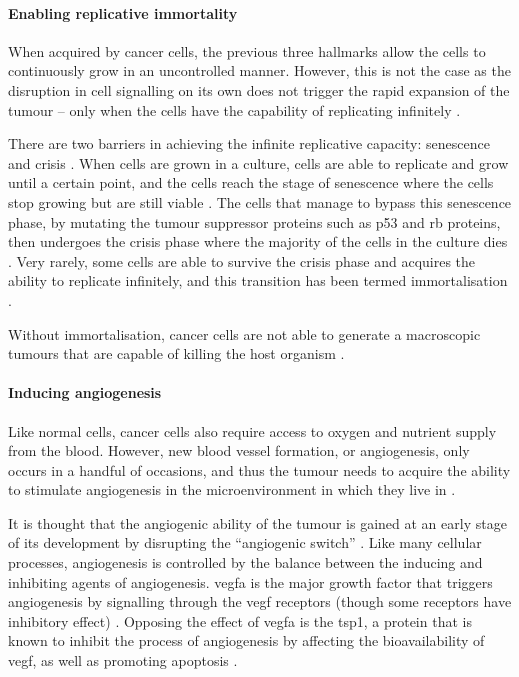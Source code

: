 \paragraph{Enabling replicative immortality}

\noindent
When acquired by cancer cells, the previous three hallmarks allow the cells to continuously grow in an uncontrolled manner.
However, this is not the case as the disruption in cell signalling on its own does not trigger the rapid expansion of the tumour -- only when the cells have the capability of replicating infinitely \citep{Hanahan2000, Hanahan2011}.

There are two barriers in achieving the infinite replicative capacity: senescence and crisis \citep{Hanahan2011}.
When cells are grown in a culture, cells are able to replicate and grow until a certain point, and the cells reach the stage of senescence where the cells stop growing but are still viable \citep{Hanahan2011}.
The cells that manage to bypass this senescence phase, by mutating the tumour suppressor proteins such as p53 and \gls{rb} proteins, then undergoes the crisis phase where the majority of the cells in the culture dies \citep{Hanahan2011}.
Very rarely, some cells are able to survive the crisis phase and acquires the ability to replicate infinitely, and this transition has been termed immortalisation \citep{Hanahan2011, Wright1989}.

Without immortalisation, cancer cells are not able to generate a macroscopic tumours that are capable of killing the host organism \citep{Hanahan2000,Hanahan2011}.

\paragraph{Inducing angiogenesis}

\noindent
Like normal cells, cancer cells also require access to oxygen and nutrient supply from the blood.
However, new blood vessel formation, or angiogenesis, only occurs in a handful of occasions, and thus the tumour needs to acquire the ability to stimulate angiogenesis in the microenvironment in which they live in \citep{Hanahan2011}.

It is thought that the angiogenic ability of the tumour is gained at an early stage of its development by disrupting the ``angiogenic switch'' \citep{Hanahan2011}.
Like many cellular processes, angiogenesis is controlled by the balance between the inducing and inhibiting agents of angiogenesis.
\Gls{vegfa} is the major growth factor that triggers angiogenesis by signalling through the \acrshort{vegf} receptors (though some receptors have inhibitory effect) \citep{Yancopoulos2000}.
Opposing the effect of \Gls{vegfa} is the \gls{tsp1}, a protein that is known to inhibit the process of angiogenesis by affecting the bioavailability of \acrshort{vegf}, as well as promoting apoptosis \citep{Kazerounian2008}.

